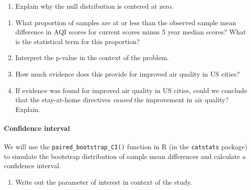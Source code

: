 \documentclass[
]{report}
\providecommand{\tightlist}{%
  \setlength{\itemsep}{0pt}\setlength{\parskip}{0pt}}
\begin{document}
\vspace{1.8in}

\begin{enumerate}
\def\labelenumi{\arabic{enumi}.}
\setcounter{enumi}{10}
\tightlist
\item
  Explain why the null distribution is centered at zero.
\end{enumerate}

\vspace{.5in}

\begin{enumerate}
\def\labelenumi{\arabic{enumi}.}
\setcounter{enumi}{11}
\item
  What proportion of samples are at or less than the observed sample mean difference in AQI scores for current scores minus 5 year median scores? What is the statistical term for this proportion?
  \vspace{.3in}
\item
  Interpret the p-value in the context of the problem.
  \vspace{1in}
\item
  How much evidence does this provide for improved air quality in US cities?
  \vspace{.3in}
\item
  If evidence was found for improved air quality in US cities, could we conclude that the stay-at-home directives \emph{caused} the improvement in air quality? Explain.
  \vspace{.8in}
\end{enumerate}

\newpage

\hypertarget{confidence-interval-5}{%
\paragraph*{Confidence interval}\label{confidence-interval-5}}

We will use the \texttt{paired\_bootstrap\_CI()} function in R (in the \texttt{catstats} package) to simulate the bootstrap distribution of sample mean differences and calculate a confidence interval.

\begin{enumerate}
\def\labelenumi{\arabic{enumi}.}
\setcounter{enumi}{15}
\tightlist
\item
  Write out the parameter of interest in context of the study.
\end{enumerate}
\end{document}
